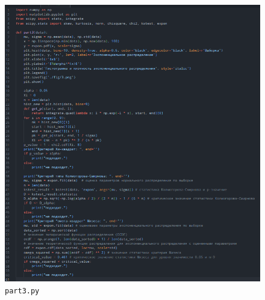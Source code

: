 \documentclass[a4paper,12pt]{article}
\begin{document}
    \begin{figure}[H]
        \centering
        \includegraphics[width=\linewidth]{polytech/stats/homework-2/subfiles/fig/part3}
        \caption{\texttt{part3.py}}
    \end{figure}
\end{document}
